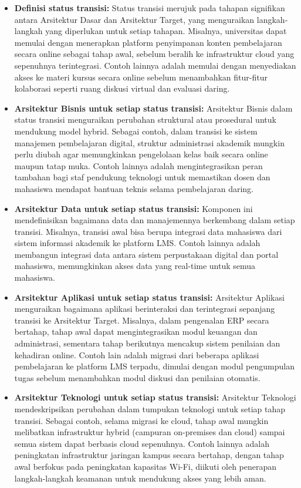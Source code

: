 \begin{itemize}
	\item \textbf{Definisi status transisi:} Status transisi merujuk pada tahapan signifikan antara Arsitektur Dasar dan Arsitektur Target, yang menguraikan langkah-langkah yang diperlukan untuk setiap tahapan. Misalnya, universitas dapat memulai dengan menerapkan platform penyimpanan konten pembelajaran secara online sebagai tahap awal, sebelum beralih ke infrastruktur cloud yang sepenuhnya terintegrasi. Contoh lainnya adalah memulai dengan menyediakan akses ke materi kursus secara online sebelum menambahkan fitur-fitur kolaborasi seperti ruang diskusi virtual dan evaluasi daring.
	
	\item \textbf{Arsitektur Bisnis untuk setiap status transisi:} Arsitektur Bisnis dalam status transisi menguraikan perubahan struktural atau prosedural untuk mendukung model hybrid. Sebagai contoh, dalam transisi ke sistem manajemen pembelajaran digital, struktur administrasi akademik mungkin perlu diubah agar memungkinkan pengelolaan kelas baik secara online maupun tatap muka. Contoh lainnya adalah mengintegrasikan peran tambahan bagi staf pendukung teknologi untuk memastikan dosen dan mahasiswa mendapat bantuan teknis selama pembelajaran daring.
	
	\item \textbf{Arsitektur Data untuk setiap status transisi:} Komponen ini mendefinisikan bagaimana data dan manajemennya berkembang dalam setiap transisi. Misalnya, transisi awal bisa berupa integrasi data mahasiswa dari sistem informasi akademik ke platform LMS. Contoh lainnya adalah membangun integrasi data antara sistem perpustakaan digital dan portal mahasiswa, memungkinkan akses data yang real-time untuk semua mahasiswa.
	
	\item \textbf{Arsitektur Aplikasi untuk setiap status transisi:} Arsitektur Aplikasi menguraikan bagaimana aplikasi berinteraksi dan terintegrasi sepanjang transisi ke Arsitektur Target. Misalnya, dalam pengenalan ERP secara bertahap, tahap awal dapat mengintegrasikan modul keuangan dan administrasi, sementara tahap berikutnya mencakup sistem penilaian dan kehadiran online. Contoh lain adalah migrasi dari beberapa aplikasi pembelajaran ke platform LMS terpadu, dimulai dengan modul pengumpulan tugas sebelum menambahkan modul diskusi dan penilaian otomatis.
	
	\item \textbf{Arsitektur Teknologi untuk setiap status transisi:} Arsitektur Teknologi mendeskripsikan perubahan dalam tumpukan teknologi untuk setiap tahap transisi. Sebagai contoh, selama migrasi ke cloud, tahap awal mungkin melibatkan infrastruktur hybrid (campuran on-premises dan cloud) sampai semua sistem dapat berbasis cloud sepenuhnya. Contoh lainnya adalah peningkatan infrastruktur jaringan kampus secara bertahap, dengan tahap awal berfokus pada peningkatan kapasitas Wi-Fi, diikuti oleh penerapan langkah-langkah keamanan untuk mendukung akses yang lebih aman.
\end{itemize}

